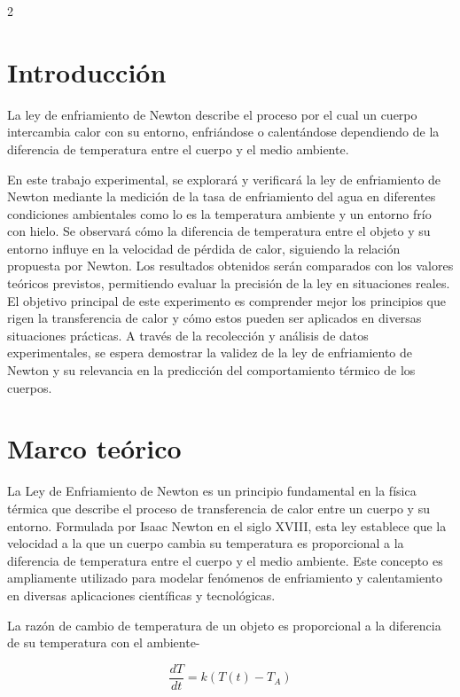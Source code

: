 \documentclass[11pt,letterpaper]{article}
\begin{document}
\begin{multicols}{2}

\section{Introducción}
La ley de enfriamiento de Newton describe el proceso por el cual un cuerpo intercambia calor con su entorno, enfriándose o calentándose dependiendo de la diferencia de temperatura entre el cuerpo y el medio ambiente.

En este trabajo experimental, se explorará y verificará la ley de enfriamiento de Newton mediante la medición de la tasa de enfriamiento del agua en diferentes condiciones ambientales como lo es la temperatura ambiente y un entorno frío con hielo. Se observará cómo la diferencia de temperatura entre el objeto y su entorno influye en la velocidad de pérdida de calor, siguiendo la relación propuesta por Newton. Los resultados obtenidos serán comparados con los valores teóricos previstos, permitiendo evaluar la precisión de la ley en situaciones reales.
El objetivo principal de este experimento es comprender mejor los principios que rigen la transferencia de calor y cómo estos pueden ser aplicados en diversas situaciones prácticas. A través de la recolección y análisis de datos experimentales, se espera demostrar la validez de la ley de enfriamiento de Newton y su relevancia en la predicción del comportamiento térmico de los cuerpos.

\section{Marco teórico}

La Ley de Enfriamiento de Newton es un principio fundamental en la física térmica que describe el proceso de transferencia de calor entre un cuerpo y su entorno. Formulada por Isaac Newton en el siglo XVIII, esta ley establece que la velocidad a la que un cuerpo cambia su temperatura es proporcional a la diferencia de temperatura entre el cuerpo y el medio ambiente. Este concepto es ampliamente utilizado para modelar fenómenos de enfriamiento y calentamiento en diversas aplicaciones científicas y tecnológicas.

La razón de cambio de temperatura de un objeto es proporcional a la diferencia de su temperatura con el ambiente-

\begin{equation}
\frac{dT}{dt} = k(T(t)-T_A)
\end{equation}


\end{multicols}
\end{document}
